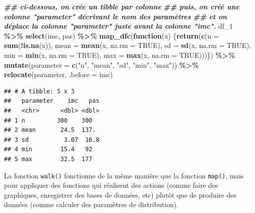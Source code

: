 \documentclass[
]{book}
\newenvironment{Shaded}{\begin{snugshade}}{\end{snugshade}}
\newcommand{\AttributeTok}[1]{\textcolor[rgb]{0.13,0.29,0.53}{#1}}
\newcommand{\ConstantTok}[1]{\textcolor[rgb]{0.56,0.35,0.01}{#1}}
\newcommand{\ControlFlowTok}[1]{\textcolor[rgb]{0.13,0.29,0.53}{\textbf{#1}}}
\newcommand{\DocumentationTok}[1]{\textcolor[rgb]{0.56,0.35,0.01}{\textbf{\textit{#1}}}}
\newcommand{\FunctionTok}[1]{\textcolor[rgb]{0.13,0.29,0.53}{\textbf{#1}}}
\newcommand{\NormalTok}[1]{#1}
\newcommand{\SpecialCharTok}[1]{\textcolor[rgb]{0.81,0.36,0.00}{\textbf{#1}}}
\newcommand{\StringTok}[1]{\textcolor[rgb]{0.31,0.60,0.02}{#1}}
\begin{document}
\begin{Shaded}
\begin{Highlighting}[]
\DocumentationTok{\#\# ci{-}dessous, on crée un tibble par colonne}
\DocumentationTok{\#\# puis, on créé une colonne "parameter" décrivant le nom des paramètres}
\DocumentationTok{\#\#  et on déplace la colonne "parameter" juste avant la colonne "imc".}
\NormalTok{df\_1 }\SpecialCharTok{\%\textgreater{}\%}
  \FunctionTok{select}\NormalTok{(imc, pas) }\SpecialCharTok{\%\textgreater{}\%}
  \FunctionTok{map\_dfc}\NormalTok{(}\ControlFlowTok{function}\NormalTok{(x) \{}\FunctionTok{return}\NormalTok{(}\FunctionTok{c}\NormalTok{(}\AttributeTok{n =} \FunctionTok{sum}\NormalTok{(}\SpecialCharTok{!}\FunctionTok{is.na}\NormalTok{(x)),}
                                \AttributeTok{mean =} \FunctionTok{mean}\NormalTok{(x, }\AttributeTok{na.rm =} \ConstantTok{TRUE}\NormalTok{),}
                                \AttributeTok{sd =} \FunctionTok{sd}\NormalTok{(x, }\AttributeTok{na.rm =} \ConstantTok{TRUE}\NormalTok{),}
                                \AttributeTok{min =} \FunctionTok{min}\NormalTok{(x, }\AttributeTok{na.rm =} \ConstantTok{TRUE}\NormalTok{), }
                                \AttributeTok{max =} \FunctionTok{max}\NormalTok{(x, }\AttributeTok{na.rm =} \ConstantTok{TRUE}\NormalTok{)))\}) }\SpecialCharTok{\%\textgreater{}\%}
  \FunctionTok{mutate}\NormalTok{(}\AttributeTok{parameter =} \FunctionTok{c}\NormalTok{(}\StringTok{"n"}\NormalTok{, }\StringTok{"mean"}\NormalTok{, }\StringTok{"sd"}\NormalTok{, }\StringTok{"min"}\NormalTok{, }\StringTok{"max"}\NormalTok{)) }\SpecialCharTok{\%\textgreater{}\%}
  \FunctionTok{relocate}\NormalTok{(parameter, }\AttributeTok{.before =}\NormalTok{ imc)}
\end{Highlighting}
\end{Shaded}

\begin{verbatim}
## # A tibble: 5 x 3
##   parameter    imc   pas
##   <chr>      <dbl> <dbl>
## 1 n         300    300  
## 2 mean       24.5  137. 
## 3 sd          3.07  16.8
## 4 min        15.4   92  
## 5 max        32.5  177
\end{verbatim}

La fonction \texttt{walk()} fonctionne de la même manière que la fonction \texttt{map()}, mais pour appliquer des fonctions qui réalisent des actions (comme faire des graphiques, enregistrer des bases de données, etc) plutôt que de produire des données (comme calculer des paramètres de distribution).
\end{document}
